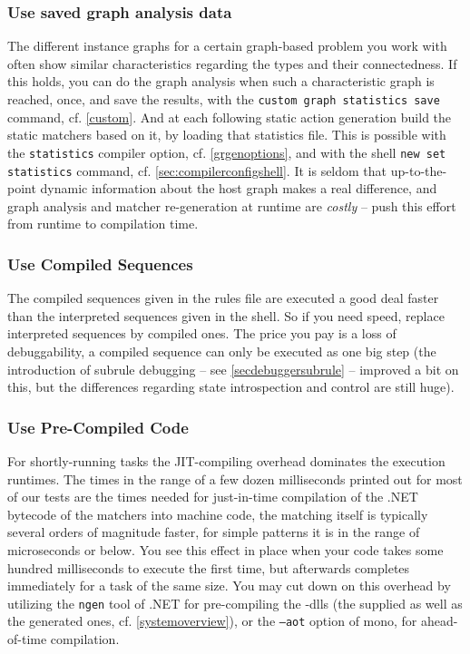 \subsubsection*{Use saved graph analysis data}
The different instance graphs for a certain graph-based problem you work with often show similar characteristics regarding the types and their connectedness.
If this holds, you can do the graph analysis when such a characteristic graph is reached, once, and save the results,
with the \texttt{custom graph statistics save} command, cf. \ref{custom}.
And at each following static action generation build the static matchers based on it, by loading that statistics file. 
This is possible with the \texttt{statistics} compiler option, cf. \ref{grgenoptions},
and with the shell \texttt{new set statistics} command, cf. \ref{sec:compilerconfigshell}. 
It is seldom that up-to-the-point dynamic information about the host graph makes a real difference,
and graph analysis and matcher re-generation at runtime are \emph{costly} -- push this effort from runtime to compilation time.

\subsubsection*{Use Compiled Sequences}
The compiled sequences given in the rules file are executed a good deal faster than the interpreted sequences given in the shell.
So if you need speed, replace interpreted sequences by compiled ones.
The price you pay is a loss of debuggability, a compiled sequence can only be executed as one big step (the introduction of subrule debugging -- see \ref{secdebuggersubrule} -- improved a bit on this, but the differences regarding state introspection and control are still huge).

\subsubsection*{Use Pre-Compiled Code}
For shortly-running tasks the JIT-compiling overhead dominates the execution runtimes.
The times in the range of a few dozen milliseconds printed out for most of our tests are the times needed for just-in-time compilation of the .NET bytecode of the matchers into machine code, the matching itself is typically several orders of magnitude faster, for simple patterns it is in the range of microseconds or below.
You see this effect in place when your code takes some hundred milliseconds to execute the first time, but afterwards completes immediately for a task of the same size.
You may cut down on this overhead by utilizing the \texttt{ngen} tool of .NET for pre-compiling the \GrG-dlls (the supplied as well as the generated ones, cf. \ref{systemoverview}), or the \texttt{--aot} option of mono, for ahead-of-time compilation.



